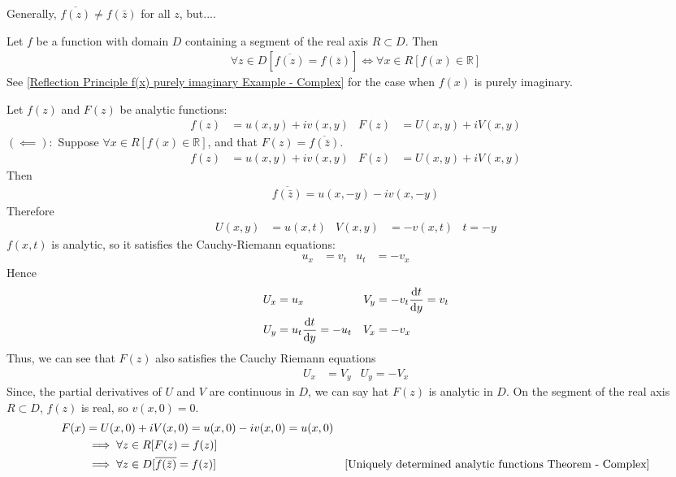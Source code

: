 \documentclass[12pt, english]{book}
\makeatletter
\renewenvironment{proof}[1][\proofname]{\par
	\pushQED{\qed}%
	\normalfont \topsep6\p@\@plus6\p@\relax
	\list{}{%
		\settowidth{\leftmargin}{\itshape\proofname:\hskip\labelsep}%
		\setlength{\labelwidth}{0pt}%
		\setlength{\itemindent}{-\leftmargin}%
		}%
	\item[\hskip\labelsep\itshape#1\@addpunct{:}]\ignorespaces
	}{\popQED\endlist\@endpefalse}
\makeatother
\begin{document}
	Generally, \(\overline{f(z)} \neq f(\bar{z})\) for all \(z\), but....
	
	\begin{theorem}
		\label{Reflection Principle Theorem - Complex}
		Let \(f\) be a function with domain \(D\) containing a segment of the real axis \(R \subset D\). Then 
		\begin{align*}
			\forall z \in D[ \overline{f(z)} = f(\bar{z}) ]
			\iff
			\forall x \in R [f(x) \in \mathbb{R}]
		\end{align*}
		See \cref{Reflection Principle f(x) purely imaginary Example - Complex} for the case when \(f(x)\) is purely imaginary.
	\end{theorem}
	\begin{proof} 
		Let \(f(z)\) and \(F(z)\) be analytic functions: 
		\begin{align*}
			f(z) &= u(x,y) + iv(x,y) & F(z) &= U(x,y) + iV(x,y)
		\end{align*}
		\underline{\((\impliedby):\)} \newline
		Suppose \(\forall x \in R[f(x) \in \mathbb{R}]\), and that \(F(z) = \overline{f(\bar{z})}\).
		\begin{align*}
			f(z) &= u(x,y) + iv(x,y) & F(z) &= U(x,y) + iV(x,y)
		\end{align*}
		Then
		\begin{align*}
			\overline{f(\bar{z})} = u(x, -y) - iv(x,-y)
		\end{align*}
		Therefore
		\begin{align*}
			U(x,y) &= u(x,t) & V(x,y) &= -v(x,t) & t = -y
		\end{align*}
		\(f(x,t)\) is analytic, so it satisfies the Cauchy-Riemann equations:
		\begin{align*}
			u_x &= v_t & u_t &= -v_x
		\end{align*}
		Hence 
		\begin{align*}
			U_x &= u_x & V_y &= -v_t \dv{t}{y} = v_t \\
			U_y &= u_t \dv{t}{y} = -u_t & V_x &= -v_x
		\end{align*}
		Thus, we can see that \(F(z)\) also satisfies the Cauchy Riemann equations 
		\begin{align*}
			U_x &= V_y  & U_y = -V_x
		\end{align*}
		Since, the partial derivatives of \(U\) and \(V\) are continuous in \(D\), we can say hat \(F(z)\) is analytic in \(D\). On the segment of the real axis \(R \subset D\), \(f(z)\) is real, so \(v(x,0) = 0\). 
		\begin{align*}
			F(x) &= U(x, 0) + iV(x,0) = u(x,0) - iv(x, 0) = u(x, 0)\\
			&\implies \forall z \in R[F(z) = f(z) ]\\
			&\implies \forall z \in D [\overline{f(\bar{z})} = f(z)] 
				& \Cref{Uniquely determined analytic functions Theorem - Complex}
		\end{align*}
		

\end{proof}
\end{document}
